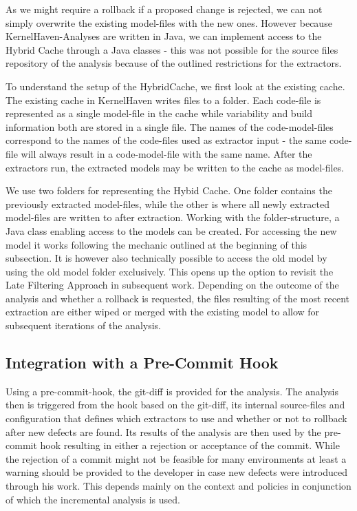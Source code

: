 \documentclass[a4paper]{article}
\begin{document}
As we might require a rollback if a proposed change is rejected, we can not simply overwrite the existing model-files with the new ones. However because KernelHaven-Analyses are written in Java, we can implement access to the Hybrid Cache through a Java classes - this was not possible for the source files repository of the analysis because of the outlined restrictions for the extractors.

To understand the setup of the HybridCache, we first look at the existing cache. The existing cache in KernelHaven writes files to a folder. Each code-file is represented as a single model-file in the cache while variability and build information both are stored in a single file. The names of the code-model-files correspond to the names of the code-files used as extractor input - the same code-file will always result in a code-model-file with the same name. After the extractors run, the extracted models may be written to the cache as model-files.

We use two folders for representing the Hybid Cache. One folder contains the previously extracted model-files, while the other is where all newly extracted model-files are written to after extraction. Working with the folder-structure, a Java class enabling access to the models can be created. For accessing the new model it works following the mechanic outlined at the beginning of this subsection. It is however also technically possible to access the old model by using the old model folder exclusively. This opens up the option to revisit the Late Filtering Approach in subsequent work. Depending on the outcome of the analysis and whether a rollback is requested, the files resulting of the most recent extraction are either wiped or merged with the existing model to allow for subsequent iterations of the analysis.

\subsection{Integration with a Pre-Commit Hook}

Using a pre-commit-hook, the git-diff is provided for the analysis. The analysis then is triggered from the hook based on the git-diff, its internal source-files and configuration that defines which extractors to use and whether or not to rollback after new defects are found. Its results of the analysis are then used by the pre-commit hook resulting in either a rejection or acceptance of the commit. While the rejection of a commit might not be feasible for many environments at least a warning should be provided to the developer in case new defects were introduced through his work. This depends mainly on the context and policies in conjunction of which the incremental analysis is used. 
\end{document}

